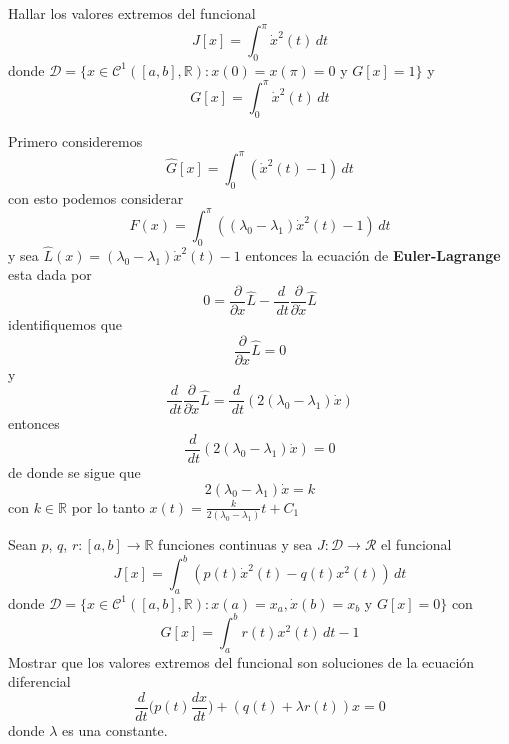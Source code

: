 \documentclass{ejercicios}
\begin{document}
\begin{exercise}
  Hallar los valores extremos del funcional 
  \[
    J[x] = \int_{0}^{\pi}\dot{x}^2(t)\,dt
  \]
  donde $\mathcal{D} = \{x\in\mathcal{C}^1([a,b],\mathbb{R}):x(0) = x(\pi) = 0$ y $G[x] = 1\}$ y 
  \[
    G[x] = \int_{0}^{\pi}\dot{x}^2(t)\,dt
  \]
\end{exercise}

\begin{solution}
  Primero consideremos 
\[\hat{G}[x] = \int_{0}^{\pi} (\dot{x}^2(t) - 1)\,dt\]
con esto podemos considerar 
\[\hat{F}(x) = \int_{0}^{\pi} ((\lambda_0 - \lambda_1)\dot{x}^2(t) - 1)\,dt \]
y sea $\hat{L}(x) = (\lambda_0 - \lambda_1)\dot{x}^2(t) - 1$ entonces la ecuación de \textbf{Euler-Lagrange} esta dada por
\[0 = \frac{\partial}{\partial x}\hat{L} - \frac{d}{\,dt}\frac{\partial}{\partial\dot{x}}\hat{L}\]
identifiquemos que \[\frac{\partial}{\partial x}\hat{L} = 0\] y 
\[\frac{d}{\,dt}\frac{\partial}{\partial\dot{x}}\hat{L} = \frac{d}{\,dt}(2(\lambda_0 - \lambda_1)\dot{x})\]
entonces
\[\frac{d}{\,dt}(2(\lambda_0 - \lambda_1)\dot{x}) = 0\]
de donde se sigue que 
\[2(\lambda_0 - \lambda_1)\dot{x} = k\]
con $k\in\mathbb{R}$ por lo tanto $x(t) = \frac{k}{2(\lambda_0 - \lambda_1)}t + C_1$
\end{solution}

\begin{exercise}
  Sean $p$, $q$, $r:[a,b]\to\mathbb{R}$ funciones continuas y sea $J:\mathcal{D}\to\mathcal{R}$ el funcional
  \[J[x] = \int_{a}^{b}(p(t)\dot{x}^2(t) - q(t)x^2(t))\,dt\]
  donde $\mathcal{D} = \{x\in\mathcal{C}^1([a,b],\mathbb{R}):x(a) = x_a, \dot{x}(b) = x_b$ y $G[x] = 0\}$ con 
  \[G[x] = \int_{a}^{b}r(t)x^2(t)\,dt - 1\]
  Mostrar que los valores extremos del funcional son soluciones de la ecuación diferencial
  \[
    \frac{d}{dt}\big(p(t)\frac{dx}{dt}\big) + (q(t) + \lambda r(t))x = 0
  \]
  donde $\lambda$ es una constante.
\end{exercise}
\end{document}
